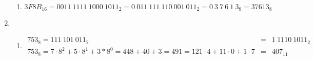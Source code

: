 \documentclass[DIN, pagenumber=false, fontsize=11pt, parskip=half]{scrartcl}
\begin{document}
\begin{enumerate}
\begin{enumerate}
                \item
                    \begin{equation*}
                        {3F8B}_{16} = {0011\ 1111\ 1000\ 1011}_2 = {0\ 011\ 111\ 110\ 001\ 011}_2 = {0\ 3\ 7\ 6\ 1\ 3}_8 = {37613}_8
                    \end{equation*}
            \end{enumerate}
        \item 
            \begin{enumerate}
                \item 
                    \begin{eqnarray*}
                        {753}_8 = {111\ 101\ 011}_2 &=& {1\ 1110\ 1011}_2 \\
                        {753}_8 = 7\cdot8^2 + 5\cdot8^1 + 3*8^0 = 448 + 40 + 3 = 491 = 121\cdot4 + 11\cdot0 + 1\cdot7 &=& {407}_{11}
                    \end{eqnarray*}
            \end{enumerate}
    \end{enumerate}
\end{document}
